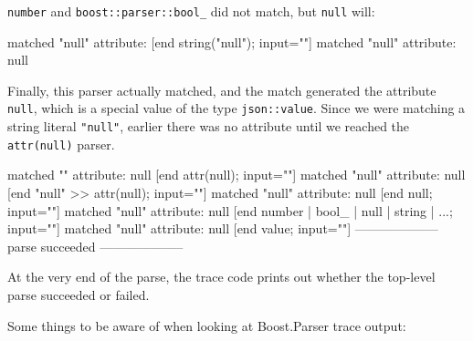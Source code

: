 \texttt{number} and \texttt{boost::parser::bool\_} did not match, but \texttt{null} will:

\begin{code}
[begin null; input="null"]
  [begin "null" >> attr(null); input="null"]
    [begin "null"; input="null"]
      [begin string("null"); input="null"]
        matched "null"
        attribute:
      [end string("null"); input=""]
      matched "null"
      attribute: null
\end{code}

Finally, this parser actually matched, and the match generated the attribute \texttt{null}, which is a special value of the type \texttt{json::value}. Since we were matching a string literal \texttt{"null"}, earlier there was no attribute until we reached the \texttt{attr(null)} parser.

\begin{code}
        [end "null"; input=""]
        [begin attr(null); input=""]
          matched ""
          attribute: null
        [end attr(null); input=""]
        matched "null"
        attribute: null
      [end "null" >> attr(null); input=""]
      matched "null"
      attribute: null
    [end null; input=""]
    matched "null"
    attribute: null
  [end number | bool_ | null | string | ...; input=""]
  matched "null"
  attribute: null
[end value; input=""]
--------------------
parse succeeded
--------------------
\end{code}

At the very end of the parse, the trace code prints out whether the top-level parse succeeded or failed.

Some things to be aware of when looking at Boost.Parser trace output:


